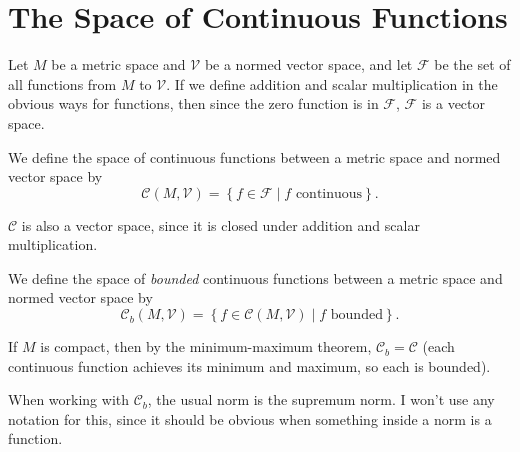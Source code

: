 \documentclass[10pt]{report}
\begin{document}

\section{The Space of Continuous Functions}

Let $M$ be a metric space and $\mathcal{V}$ be a normed vector space, and let $\mathcal{F}$ be the set of all functions from $M$ to $\mathcal{V}$. If we define addition and scalar multiplication in the obvious ways for functions, then since the zero function is in $\mathcal{F}$, $\mathcal{F}$ is a vector space.

\begin{defn}[]
We define the space of continuous functions between a metric space and normed vector space by
\[
	\mathcal{C}(M,\mathcal{V}) = \left\{ f \in \mathcal{F} \;|\; f \text{ continuous} \right\}.
\] 
\end{defn}

$\mathcal{C}$ is also a vector space, since it is closed under addition and scalar multiplication.

\begin{defn}[]
We define the space of \textit{bounded} continuous functions between a metric space and normed vector space by
\[
	\mathcal{C}_b(M, \mathcal{V}) = \left\{ f \in \mathcal{C}(M, \mathcal{V}) \;|\; f \text{ bounded} \right\}.
\] 
\end{defn}

If $M$ is compact, then by the minimum-maximum theorem, $\mathcal{C}_b = \mathcal{C}$ (each continuous function achieves its minimum and maximum, so each is bounded).

When working with $\mathcal{C}_b$, the usual norm is the supremum norm. I won't use any notation for this, since it should be obvious when something inside a norm is a function.
\end{document}
